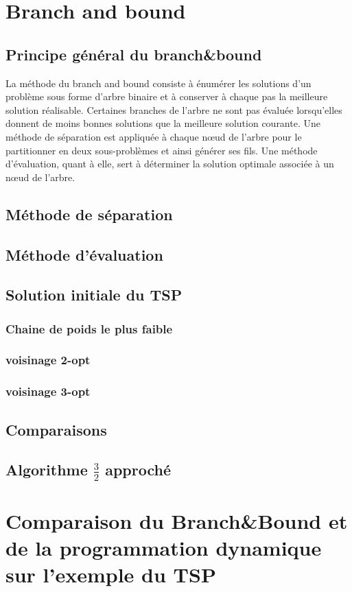 
\section{Branch and bound}

\subsection{Principe général du branch\&bound}
La méthode du branch and bound consiste à énumérer les solutions d'un problème sous forme d'arbre binaire et à conserver à chaque pas la meilleure solution réalisable. Certaines branches de l'arbre ne sont pas évaluée lorsqu'elles donnent de moins bonnes solutions que la meilleure solution courante. Une méthode de séparation est appliquée à chaque nœud de l'arbre pour le partitionner en deux sous-problèmes et ainsi générer ses fils. Une méthode d'évaluation, quant à elle, sert à déterminer la solution optimale associée à un nœud de l'arbre.

\subsection{Méthode de séparation}


\subsection{Méthode d'évaluation}


\subsection{Solution initiale du TSP}

\subsubsection{Chaine de poids le plus faible}

\subsubsection{voisinage 2-opt}

\subsubsection{voisinage 3-opt}


\subsection{Comparaisons}


\subsection{Algorithme $\frac{3}{2}$ approché}



\section{Comparaison du Branch\&Bound et de la programmation dynamique sur l'exemple du TSP}


